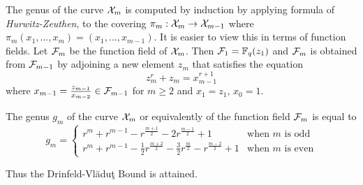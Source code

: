 The genus of the curve $\mathcal{X}_m$ is computed by induction by applying formula of \textit{Hurwitz-Zeuthen}, \cite{hartshorne} to the covering $\pi_m:\mathcal{X}_m\to \mathcal{X}_{m-1}$ where $\pi_m(x_1,\dots, x_m)=(x_1,\dots, x_{m-1})$. It is easier to view this in terms of function fields. Let $\mathcal{F}_m$ be the function field of $\mathcal{X}_m$. Then $\mathcal{F}_1=\mathbb{F}_q(z_1)$ and $\mathcal{F}_m$ is obtained from $\mathcal{F}_{m-1}$ by adjoining a new element $z_m$ that satisfies the equation $$z_m^r+z_m=x_{m-1}^{r+1}$$ where $x_{m-1}=\frac{z_{m-1}}{x_{m-2}}\in \mathcal{F}_{m-1}$ for $m\geq 2$ and $x_1=z_1$, $x_0=1$.
\begin{theorem}
	The genus $g_m$ of the curve $\mathcal{X}_m$ or equivalently of the function field $\mathcal{F}_m$ is equal to $$g_m=\begin{cases}
		r^m+r^{m-1}-r^{\frac{m+1}2}-2r^{\frac{m-1}2}+1 & \text{when $m$ is odd}\\
		r^m+r^{m-1}-\frac12 r^{\frac{m+2}2}-\frac32r^{\frac{m}2}-r^{\frac{m-2}2}+1 & \text{when $m$ is even}
	\end{cases}$$
\end{theorem}
Thus the Drinfeld-Vl\u{a}du\c{t} Bound is attained.